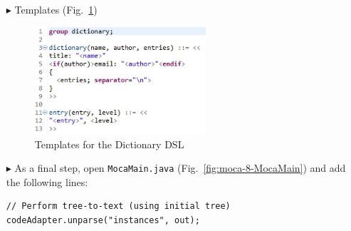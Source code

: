 \begin{enumerate}
\item[$\blacktriangleright$] Templates
  (Fig.~\ref{fig:moca-DictionaryTemplates})    
\begin{figure}[!htbp]
\begin{center}
 \includegraphics[width=0.6\textwidth]{pics/moca/4ModelToMocaTree/DictionaryTemplates}
  \caption{Templates for the Dictionary DSL} 
  \label{fig:moca-DictionaryTemplates}
\end{center}
\end{figure} 

\item[$\blacktriangleright$] As a final step, open \texttt{MocaMain.java}
(Fig.~\ref{fig:moca-8-MocaMain}) and add the following lines:
\begin{verbatim}
// Perform tree-to-text (using initial tree)
codeAdapter.unparse("instances", out);
\end{verbatim}
\end{enumerate}